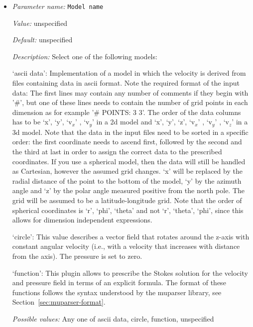 \begin{itemize}
\item {\it Parameter name:} {\tt Model name}
\label{parameters:Prescribed Stokes solution/Model name}


{\it Value:} unspecified


{\it Default:} unspecified


{\it Description:} Select one of the following models:

`ascii data': Implementation of a model in which the velocity is derived from files containing data in ascii format. Note the required format of the input data: The first lines may contain any number of comments if they begin with '\#', but one of these lines needs to contain the number of grid points in each dimension as for example '\# POINTS: 3 3'. The order of the data columns has to be `x', `y', `v$_x$' , `v$_y$' in a 2d model and  `x', `y', `z', `v$_x$' , `v$_y$' , `v$_z$' in a 3d model. Note that the data in the input files need to be sorted in a specific order: the first coordinate needs to ascend first, followed by the second and the third at last in order to assign the correct data to the prescribed coordinates. If you use a spherical model, then the data will still be handled as Cartesian, however the assumed grid changes. `x' will be replaced by the radial distance of the point to the bottom of the model, `y' by the azimuth angle and `z' by the polar angle measured positive from the north pole. The grid will be assumed to be a latitude-longitude grid. Note that the order of spherical coordinates is `r', `phi', `theta' and not `r', `theta', `phi', since this allows for dimension independent expressions.

`circle': This value describes a vector field that rotates around the z-axis with constant angular velocity (i.e., with a velocity that increases with distance from the axis). The pressure is set to zero.

`function': This plugin allows to prescribe the Stokes solution for the velocity and pressure field in terms of an explicit formula. The format of these functions follows the syntax understood by the muparser library, see Section~\ref{sec:muparser-format}.


{\it Possible values:} Any one of ascii data, circle, function, unspecified
\end{itemize}



